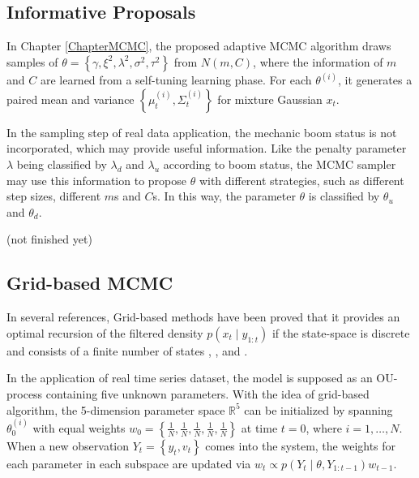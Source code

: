 \subsection*{Informative Proposals}

In Chapter \ref{ChapterMCMC}, the proposed adaptive MCMC algorithm draws samples of $\theta=\left\lbrace\gamma,\xi^2,\lambda^2,\sigma^2,\tau^2\right\rbrace$ from $N(m,C)$, where the information of $m$ and $C$ are learned from a self-tuning learning phase. For each $\theta^{(i)}$, it generates a paired mean and variance $\left\lbrace\mu_t^{(i)},\Sigma_t^{(i)}\right\rbrace$ for mixture Gaussian $x_t$. 

In the sampling step of real data application, the mechanic boom status is not incorporated, which may provide useful information. Like the penalty parameter $\lambda$ being classified by $\lambda_d$ and $\lambda_u$ according to boom status, the MCMC sampler may use this information to propose $\theta$ with different strategies, such as different step sizes, different $m$s and $C$s. In this way, the parameter $\theta$ is classified by $\theta_u$ and $\theta_d$. 

(not finished yet)



\subsection*{Grid-based MCMC}

In several references, Grid-based methods have been proved that it provides an optimal recursion of the filtered density $p(x_t\mid y_{1:t})$ if the state-space is discrete and consists of a finite number of states \cite{ristic2004beyond}, \cite{stroud2016bayesian}, \cite{arulampalam2002tutorial} and \cite{hartmann2016grid}. 

In the application of real time series dataset, the model is supposed as an OU-process containing five unknown parameters. With the idea of grid-based algorithm, the 5-dimension parameter space $\mathbb{R}^5$ can be initialized by spanning $\theta_0^{(i)}$ with equal weights $w_0=\left\lbrace\frac{1}{N},\frac{1}{N},\frac{1}{N},\frac{1}{N},\frac{1}{N}\right\rbrace$ at time $t=0$, where $i=1,\ldots,N$. When a new observation $Y_t=\left\lbrace y_t,v_t\right\rbrace$ comes into the system, the weights for each parameter in each subspace are updated via $w_t\propto p(Y_t\mid \theta,Y_{1:t-1})w_{t-1}$. 

